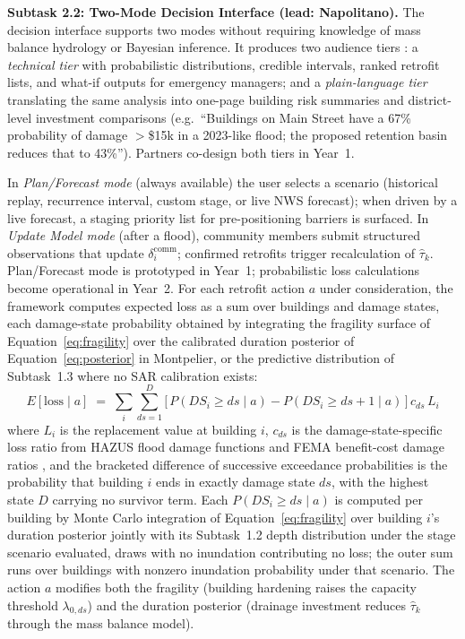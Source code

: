 \documentclass[11pt]{article}
\begin{document}
\textbf{Subtask 2.2: Two-Mode Decision Interface (lead: Napolitano).}
The decision interface supports two modes without requiring knowledge of mass
balance hydrology or Bayesian inference. It produces two audience tiers
\cite{skilton2022dontwant,habib2023anchoring,davis2024nist}: a \textit{technical
tier} with probabilistic distributions, credible intervals, ranked retrofit
lists, and what-if outputs for emergency managers; and a \textit{plain-language
tier} translating the same analysis into one-page building risk summaries and
district-level investment comparisons (e.g.\ ``Buildings on Main Street have a
67\% probability of damage $>$\$15k in a 2023-like flood; the proposed retention
basin reduces that to 43\%''). Partners co-design both tiers in Year~1.


In \textit{Plan/Forecast mode} (always available) the user selects a scenario
(historical replay, recurrence interval, custom stage, or live NWS forecast);
when driven by a live forecast, a staging priority list for pre-positioning
barriers is surfaced. In \textit{Update Model mode} (after a flood), community
members submit structured observations that update $\delta_i^{\mathrm{comm}}$;
confirmed retrofits trigger recalculation of $\hat{\tau}_k$.
Plan/Forecast mode is prototyped in Year~1; probabilistic loss calculations
become operational in Year~2.
For each retrofit action $a$ under consideration, the framework computes expected
loss as a sum over buildings and damage states, each damage-state probability
obtained by integrating the fragility surface of Equation~\eqref{eq:fragility}
over the calibrated duration posterior of Equation~\eqref{eq:posterior} in
Montpelier, or the predictive distribution of Subtask~1.3 where no SAR
calibration exists:
\begin{equation}\label{eq:loss}
  E[\text{loss} \mid a] \;=\;
  \sum_{i} \sum_{ds=1}^{D}
    \bigl[\,P(DS_i \geq ds \mid a) - P(DS_i \geq ds{+}1 \mid a)\,\bigr]\,
    c_{ds}\, L_i
\end{equation}
where $L_i$ is the replacement value at building $i$, $c_{ds}$ is the
damage-state-specific loss ratio from HAZUS flood damage functions and FEMA
benefit-cost damage ratios \cite{fema2025hazus,fema2019bcatoolkit}, and the
bracketed difference of successive exceedance probabilities is the probability
that building $i$ ends in exactly damage state $ds$, with the highest state $D$
carrying no survivor term. Each $P(DS_i \geq ds \mid a)$ is computed per building by Monte Carlo integration of Equation~\eqref{eq:fragility} over building $i$'s duration posterior jointly with its Subtask~1.2 depth distribution under the stage scenario evaluated, draws with no inundation contributing no loss; the outer sum runs over buildings with nonzero inundation probability under that scenario. The action $a$ modifies both the fragility (building hardening raises the capacity threshold $\lambda_{0,ds}$) and the duration posterior (drainage investment reduces $\hat{\tau}_k$ through the mass balance model).
\end{document}
